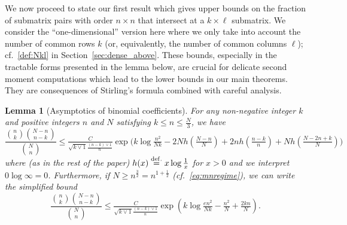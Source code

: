 \documentclass[11pt,reqno,letterpaper]{amsart}
\numberwithin{equation}{section}
\theoremstyle{plain}
\newtheorem{lemma}[theorem]{Lemma}
\begin{document}
We now proceed to state our first result which gives upper bounds on the fraction 
of submatrix pairs with order $n \times n$ that intersect at a $k \times \ell$ 
submatrix. We consider the ``one-dimensional'' version here where we only take into 
account the number of common rows $k$ (or, equivalently, the number of common 
columns $\ell$); cf.~\eqref{def:Nkl} in Section~\ref{sec:dense_above}. These bounds, especially in the tractable forms presented in the 
lemma below, are crucial for delicate second moment computations which lead to the 
lower bounds in our main theorems. They are consequences of Stirling's formula 
combined with careful analysis. 
\begin{lemma}[Asymptotics of binomial coefficients]\label{lem:factorial}
For any non-negative integer $k$ and positive integers $n$ and $N$ satisfying $k 
\le n \le \tfrac N 3$, we have
\begin{equation}\label{eq:factorial_dense}
\frac{\binom{n}{k}\binom{N - n}{n - k}}{\binom{N}{n}} \le \tfrac{C}{\sqrt{k \vee 1}\frac {(n-k)\vee1} n}\exp\big(k \log \tfrac{n^2}{Nk} - 2Nh(\tfrac{N-n}N) + 2n h(\tfrac {n - k}n) + Nh(\tfrac{N - 2n + k}N)\big)
\end{equation}
where (as in the rest of the paper) $h(x) \stackrel{{\rm def.}}{=} x \log \tfrac 1x$ for $x > 0$ and we 
interpret $0\log \infty = 0$. Furthermore, if $N \ge n^{\frac32} = n^{1 + 
\frac12}$ (cf.~\eqref{eq:mnregime}), we can write the simplified bound
\begin{equation}\label{eq:factorial}
  \frac{\binom{n}{k}\binom{N - n}{n - k}}{\binom{N}{n}} \le \tfrac{C}{\sqrt{k \vee 1}\frac {(n-k)\vee1} n}\exp(k\log \tfrac {en^2}{Nk} -\tfrac{n^2}N + \tfrac{2kn}N).
\end{equation}
\end{lemma}
\end{document}
